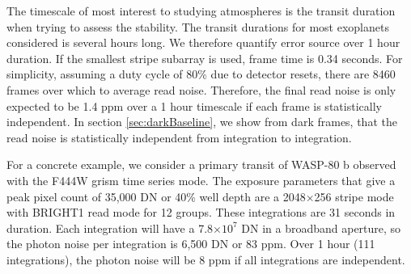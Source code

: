 \documentclass{aastex62}
\begin{document}
The timescale of most interest to studying atmospheres is the transit duration when trying to assess the stability.
The transit durations for most exoplanets considered is several hours long.
We therefore quantify error source over 1 hour duration.
If the smallest stripe subarray is used, frame time is 0.34 seconds.
For simplicity, assuming a duty cycle of 80\% due to detector resets, there are 8460 frames over which to average read noise.
Therefore, the final read noise is only expected to be 1.4 ppm over a 1 hour timescale if each frame is statistically independent.
In section \ref{sec:darkBaseline}, we show from dark frames, that the read noise is statistically independent from integration to integration.

For a concrete example, we consider a primary transit of WASP-80 b observed with the F444W grism time series mode.
The exposure parameters that give a peak pixel count of 35,000 DN or 40\% well depth are a 2048$\times$256 stripe mode with BRIGHT1 read mode for 12 groups.
These integrations are 31 seconds in duration.
Each integration will have a 7.8$\times 10^7$ DN in a broadband aperture, so the photon noise per integration is 6,500 DN or 83 ppm.
Over 1 hour (111 integrations), the photon noise will be 8 ppm if all integrations are independent.
\end{document}
